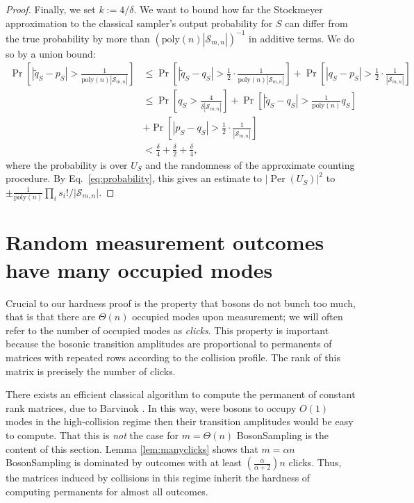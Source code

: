 \documentclass[11pt]{article}
\theoremstyle{plain}
\theoremstyle{plain}
\theoremstyle{plain}
\theoremstyle{plain}
\theoremstyle{plain}
\theoremstyle{plain}
\theoremstyle{plain}
\theoremstyle{remark}
\theoremstyle{remark}
\theoremstyle{plain}
\theoremstyle{plain}
\theoremstyle{plain}
\theoremstyle{plain}
\newcommand{\Smn}{\mathcal{S}_{m,n}}
\newcommand\poly[1]{\mathrm{poly}(#1)}
\begin{document}
\begin{proof}
Finally, we set $k := 4/\delta$.
We want to bound how far the Stockmeyer approximation to the classical sampler's output probability for $S$ can differ from the true probability by more than $(\poly{n}|{\Smn}|)^{-1}$ in additive terms. We do so by a union bound: 
\begin{align*}
\Pr \left[ |\widetilde q_S - p_S| > \frac{1}{\poly{n}|{\Smn}|} \right]
&\le \Pr \left[ |\widetilde q_S - q_S| > \frac{1}{2} \cdot \frac{1}{\poly{n}|{\Smn}|} \right] +
\Pr \left[ |q_S - p_S| > \frac{1}{2} \cdot \frac{1}{|{\Smn}|} \right] \nonumber\\
&\le \Pr\left[q_S > \frac{4}{\delta |{\Smn}|} \right] +
\Pr \left[ |\widetilde q_S - q_S| > \frac{1}{\poly{n}} q_S \right]\\& +
\Pr \left[ |p_S-q_S| > \frac{1}{2} \cdot \frac{1}{|{\Smn}|} \right] \nonumber\\
&<  \frac{\delta}{4} + \frac{\delta}{2} + \frac{\delta}{4},
\end{align*}
where the probability is over $U_S$ and the randomness of the approximate counting procedure. By Eq.~\ref{eq:probability}, this gives an estimate to $\vert\operatorname*{Per}(U_S)\vert^2$ to $\pm \frac{1}{\poly{n}}\prod_i s_i!/\vert\Smn\vert.$ 

\end{proof}

\section{Random measurement outcomes have many occupied modes}\label{sec:manyclicks}

Crucial to our hardness proof is the property that bosons do not bunch too much, that is that there are $\Theta(n)$ occupied modes upon measurement; we will often refer to the number of occupied modes as \textit{clicks}. This property is important because the bosonic transition amplitudes are proportional to permanents of matrices with repeated rows according to the collision profile. The rank of this matrix is precisely the number of clicks. 

There exists an efficient classical algorithm to compute the permanent of constant rank matrices, due to Barvinok \cite{barvinok1996two}. In this way, were bosons to occupy $O(1)$ modes in the high-collision regime then their transition amplitudes would be easy to compute. That this is \textit{not} the case for $m=\Theta(n)$
BosonSampling is the content of this section. Lemma \ref{lem:manyclicks} shows that $m=\alpha n$ BosonSampling is dominated by outcomes with at least $(\frac{\alpha}{\alpha+2})n$ clicks.
Thus, the matrices induced by collisions in this regime inherit the hardness of computing permanents for almost all outcomes.
\end{document}
